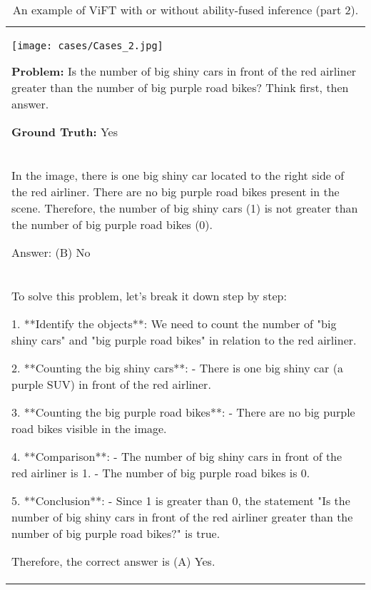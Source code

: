 \begin{table*}[htbp]
    \centering
    \renewcommand{\arraystretch}{1.2} 
    \setlength{\tabcolsep}{8pt} 
    \begin{tabular}{p{14cm}}
        \centering
        \texttt{[image: cases/Cases\_2.jpg]}
        
        \begin{tcolorbox}[colback=gray!5, colframe=gray!40, sharp corners, width=\linewidth, boxrule=0.5mm]
        \small
        \textbf{Problem: }
        Is the number of big shiny cars in front of the red airliner greater than the number of big purple road bikes? Think first, then answer.

        \textbf{Ground Truth:} Yes
        \end{tcolorbox}  %
        \begin{tcolorbox}[colback=gray!5, colframe=gray!40, sharp corners, width=\linewidth, boxrule=0.5mm]
            \small
            \textbf{ViFT Without Ability-Fused Inference:}
            \\
In the image, there is one big shiny car located to the right side of the red airliner. There are no big purple road bikes present in the scene. Therefore, the number of big shiny cars (1) is not greater than the number of big purple road bikes (0).



Answer: (B) No


        \end{tcolorbox}



        \begin{tcolorbox}[colback=gray!5, colframe=gray!40, sharp corners, width=\linewidth, boxrule=0.5mm]
        \small
        \textbf{ViFT With Ability-Fused Inference:}
        \\
To solve this problem, let's break it down step by step:

1. **Identify the objects**: We need to count the number of "big shiny cars" and "big purple road bikes" in relation to the red airliner.

2. **Counting the big shiny cars**:
   - There is one big shiny car (a purple SUV) in front of the red airliner.

3. **Counting the big purple road bikes**:
   - There are no big purple road bikes visible in the image.

4. **Comparison**:
   - The number of big shiny cars in front of the red airliner is 1.
   - The number of big purple road bikes is 0.

5. **Conclusion**:
   - Since 1 is greater than 0, the statement "Is the number of big shiny cars in front of the red airliner greater than the number of big purple road bikes?" is true.

Therefore, the correct answer is (A) Yes.


\end{tcolorbox}
\end{tabular}
\caption{An example of ViFT with or without ability-fused inference (part 2).}
\label{tab:case1}
\end{table*}
